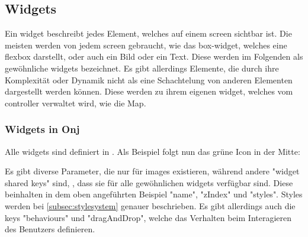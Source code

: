 
\renewcommand{\kapitelautor}{Autor: Felix Zwickelstorfer}
\subsection{Widgets}\label{sec:widgets}
\renewcommand{\kapitelautor}{Autor: Felix Zwickelstorfer}
Ein widget beschreibt jedes Element, welches auf einem screen sichtbar ist. 
Die meisten werden von jedem screen gebraucht, wie \zB das box-widget, welches eine flexbox darstellt, oder auch ein Bild oder ein Text. 
Diese werden im Folgenden als gewöhnliche widgets bezeichnet. 
Es gibt allerdings Elemente, die durch ihre Komplexität oder Dynamik nicht als eine Schachtelung von anderen Elementen dargestellt werden können. 
Diese werden zu ihrem eigenen widget, welches vom controller verwaltet wird, wie \zB die Map.
\renewcommand{\kapitelautor}{Autor: Felix Zwickelstorfer}
\subsubsection{Widgets in Onj}\label{subsubsec:widgetsinonj}
\renewcommand{\kapitelautor}{Autor: Felix Zwickelstorfer}

Alle widgets sind definiert in .
Als Beispiel folgt nun das grüne Icon in der Mitte:
Es gibt diverse Parameter, die nur für images existieren, während andere "widget shared keys" sind, \dah, dass sie für alle gewöhnlichen widgets verfügbar sind.
Diese beinhalten in dem oben angeführten Beispiel "name", "zIndex" und "styles".
Styles werden bei \ref{subsec:stylesystem} genauer beschrieben.
Es gibt allerdings auch die keys "behaviours" und "dragAndDrop", welche das Verhalten beim Interagieren des Benutzers definieren.

